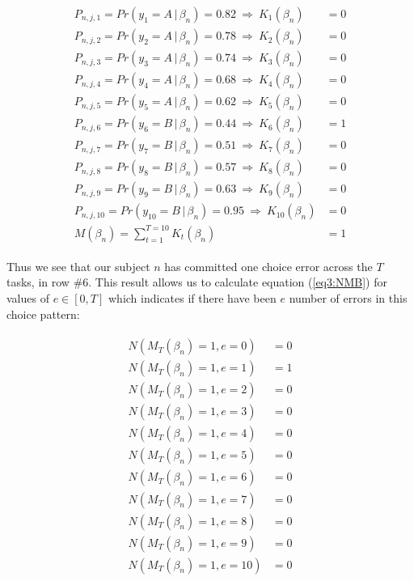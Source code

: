 \documentclass[../main.tex]{subfiles}
\begin{document}
\begin{align}
	\label{eq3:example_MTBn}
	\begin{split}
		P_{n,j,1}  = Pr(y_1 = A    \,|\, \beta_n) = 0.82 ~ \Rightarrow ~ K_{1}(\beta_n)  &= 0 \\
		P_{n,j,2}  = Pr(y_2 = A    \,|\, \beta_n) = 0.78 ~ \Rightarrow ~ K_{2}(\beta_n)  &= 0 \\
		P_{n,j,3}  = Pr(y_3 = A    \,|\, \beta_n) = 0.74 ~ \Rightarrow ~ K_{3}(\beta_n)  &= 0 \\
		P_{n,j,4}  = Pr(y_4 = A    \,|\, \beta_n) = 0.68 ~ \Rightarrow ~ K_{4}(\beta_n)  &= 0 \\
		P_{n,j,5}  = Pr(y_5 = A    \,|\, \beta_n) = 0.62 ~ \Rightarrow ~ K_{5}(\beta_n)  &= 0 \\
		P_{n,j,6}  = Pr(y_6 = B    \,|\, \beta_n) = 0.44 ~ \Rightarrow ~ K_{6}(\beta_n)  &= 1 \\
		P_{n,j,7}  = Pr(y_7 = B    \,|\, \beta_n) = 0.51 ~ \Rightarrow ~ K_{7}(\beta_n)  &= 0 \\
		P_{n,j,8}  = Pr(y_8 = B    \,|\, \beta_n) = 0.57 ~ \Rightarrow ~ K_{8}(\beta_n)  &= 0 \\
		P_{n,j,9}  = Pr(y_9 = B    \,|\, \beta_n) = 0.63 ~ \Rightarrow ~ K_{9}(\beta_n)  &= 0 \\
		P_{n,j,10} = Pr(y_{10} = B \,|\, \beta_n) = 0.95 ~ \Rightarrow ~ K_{10}(\beta_n) &= 0 \\
		                                M(\beta_n) = \sum_{t = 1}^{T = 10}{K_t(\beta_n)} &= 1
	\end{split}
\end{align}

\noindent Thus we see that our subject $n$ has committed one choice error across the $T$ tasks, in row \#6.
This result allows us to calculate equation (\ref{eq3:NMB}) for values of $e \in [ 0, T ]$ which indicates if there have been $e$ number of errors in this choice pattern:

\begin{align}
	\label{eq3:example_NMB}
	\begin{split}
		N( M_T(\beta_n) = 1, e = 0 )  &= 0 \\
		N( M_T(\beta_n) = 1, e = 1 )  &= 1 \\
		N( M_T(\beta_n) = 1, e = 2 )  &= 0 \\
		N( M_T(\beta_n) = 1, e = 3 )  &= 0 \\
		N( M_T(\beta_n) = 1, e = 4 )  &= 0 \\
		N( M_T(\beta_n) = 1, e = 5 )  &= 0 \\
		N( M_T(\beta_n) = 1, e = 6 )  &= 0 \\
		N( M_T(\beta_n) = 1, e = 7 )  &= 0 \\
		N( M_T(\beta_n) = 1, e = 8 )  &= 0 \\
		N( M_T(\beta_n) = 1, e = 9 )  &= 0 \\
		N( M_T(\beta_n) = 1, e = 10 ) &= 0 \\
	\end{split}
\end{align}
\end{document}

